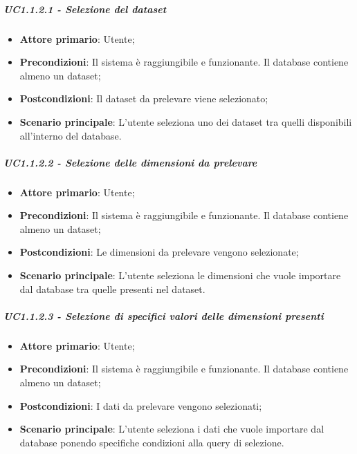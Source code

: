 \subparagraph{UC1.1.2.1 - Selezione del dataset}
\begin{itemize}
	\item \textbf{Attore primario}: Utente;
	\item \textbf{Precondizioni}: Il sistema è raggiungibile e funzionante. Il database contiene almeno un dataset;
	\item \textbf{Postcondizioni}: Il dataset da prelevare viene selezionato;
	\item \textbf{Scenario principale}: L'utente seleziona uno dei dataset tra quelli disponibili all'interno del database.
	
\end{itemize}

\subparagraph{UC1.1.2.2 - Selezione delle dimensioni da prelevare}
\begin{itemize}
	\item \textbf{Attore primario}: Utente;
	\item \textbf{Precondizioni}: Il sistema è raggiungibile e funzionante. Il database contiene almeno un dataset;
	\item \textbf{Postcondizioni}: Le dimensioni da prelevare vengono selezionate;
	\item \textbf{Scenario principale}: L'utente seleziona le dimensioni che vuole importare dal database tra quelle presenti nel dataset.
	
\end{itemize}

\subparagraph{UC1.1.2.3 - Selezione di specifici valori delle dimensioni presenti}
\begin{itemize}
	\item \textbf{Attore primario}: Utente;
	\item \textbf{Precondizioni}: Il sistema è raggiungibile e funzionante. Il database contiene almeno un dataset;
	\item \textbf{Postcondizioni}: I dati da prelevare vengono selezionati;
	\item \textbf{Scenario principale}: L'utente seleziona i dati che vuole importare dal database ponendo specifiche condizioni alla query di selezione.
	
\end{itemize}